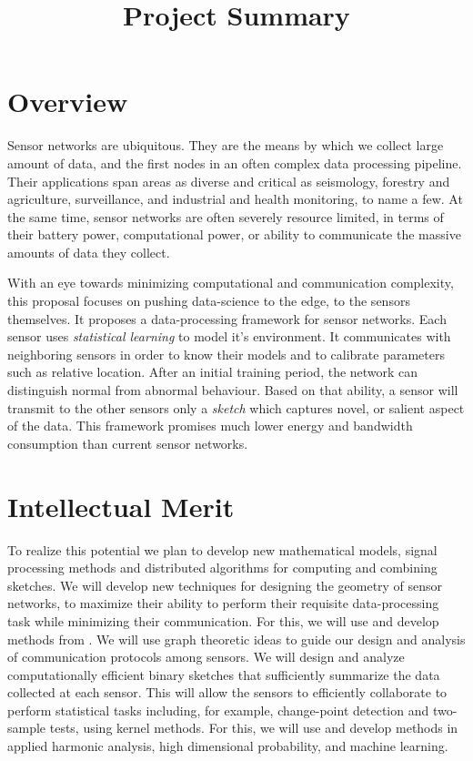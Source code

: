 \documentclass{article}
\title{Project Summary}
\begin{document}
\section{Overview}
Sensor networks are ubiquitous. They are the means by which we collect large amount of data, and the first nodes in an often complex data processing pipeline. Their applications span areas as diverse and critical as seismology, forestry and agriculture, surveillance, and industrial and health monitoring, to name a few. At the same time, sensor networks are often severely resource limited, in terms of their battery power, computational power, or ability to communicate the massive amounts of data they collect.

With an eye towards minimizing computational and communication complexity, this proposal focuses on pushing data-science to the edge, to the sensors themselves.  It proposes a data-processing framework for sensor networks. Each sensor uses {\em
  statistical learning} to model it's environment. It communicates
with neighboring sensors in order to know their models and to
calibrate parameters such as relative location. After an initial
training period, the network can distinguish normal from abnormal
behaviour. Based on that ability, a sensor will transmit to the other
sensors only a {\em sketch} which captures  novel, or
salient aspect of the data. This framework promises much lower energy and bandwidth
consumption than current sensor networks. 

\section{Intellectual Merit}
 To realize this potential we
plan to develop new  mathematical models, signal processing methods
and distributed algorithms for computing and combining sketches.
We will develop new techniques for designing the geometry of sensor networks, to maximize their ability to perform their requisite data-processing task while minimizing their communication. For this, we will use and develop methods from . We will use graph theoretic ideas to guide our design and analysis of communication protocols among sensors. We will design and analyze computationally efficient binary sketches that sufficiently summarize the data collected at each sensor. This will allow the sensors to efficiently collaborate to perform statistical tasks including, for example, change-point detection and two-sample tests, using kernel methods. For this, we will use and develop methods in applied harmonic analysis, high dimensional probability, and machine learning.     
\end{document}
